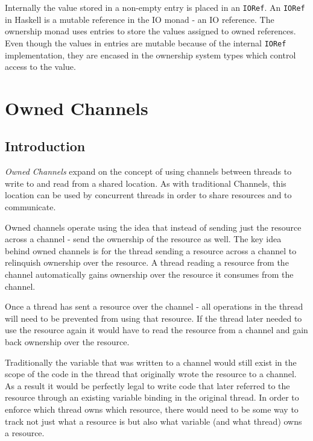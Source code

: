 \documentclass[onehalf,11pt]{beavtex}
\begin{document}
Internally the value stored in a non-empty entry is placed in an \texttt{IORef}.
An \texttt{IORef} in Haskell is a mutable reference in the IO monad - an IO
reference. %
The ownership monad uses entries to store the values assigned to owned
references.
Even though the values in entries are mutable because of the internal \texttt{IORef}
implementation, they are encased in the ownership system types which control
access to the value.




\chapter{Owned Channels}

\section{Introduction}

\textit{Owned Channels} expand on the concept of using channels between threads
to write to and read from a shared location.   As with traditional Channels,
this location can be used by concurrent threads in order to share resources and
to communicate.


Owned channels operate using the idea that instead of sending just the
resource across a channel - send the ownership of the resource as well.
The key idea behind owned channels is for the thread sending a
resource across a channel to relinquish ownership over the resource.
A thread reading a resource from the channel automatically gains ownership over
the resource it consumes from the channel.

Once a thread has sent a resource over the channel - all operations in the thread
will need to be prevented from using that resource.
If the thread later needed to use the resource again it would have to read the
resource from a channel and gain back ownership over the resource.

Traditionally the variable that was written to a channel would still exist in the
scope of the code in the thread that originally wrote the resource to a channel.
As a result it would be perfectly legal to write code that later referred to the
resource through an existing variable binding in the original thread.
In order to enforce which thread owns which resource, there would need to be
some way to track not just what a resource is but also what variable (and what
thread) owns a resource.
\end{document}
